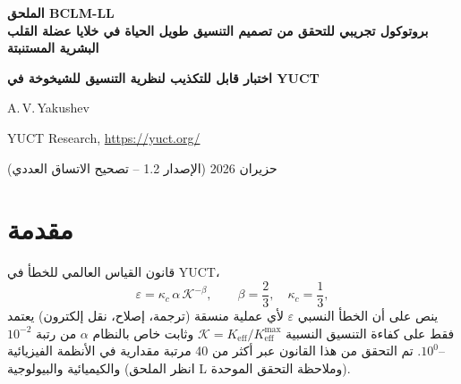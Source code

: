 \documentclass[11pt,a4paper]{article}
\newcommand{\REL}{\mathcal{K}}          %
\begin{document}
	
	\begin{titlepage}
		\centering
		\vspace*{2cm}
		{\Huge\bfseries الملحق BCLM-LL\\[0.3cm]
			بروتوكول تجريبي للتحقق من تصميم التنسيق طويل الحياة في خلايا عضلة القلب البشرية المستنبتة\par}
		\vspace{0.5cm}
		{\Large\bfseries اختبار قابل للتكذيب لنظرية التنسيق للشيخوخة في YUCT\par}
		\vspace{1.5cm}
		{\large A.\,V.\,Yakushev\par}
		{\normalsize YUCT Research, \url{https://yuct.org/}\par}
		\vspace{1.0cm}
		{\normalsize حزيران 2026 (الإصدار 1.2 – تصحيح الاتساق العددي)}\par
		\vfill
		\begin{abstract}
			\noindent
			تشرح نظرية التنسيق الموحد لياكوشيف (YUCT) الشيخوخة على أنها تقدم تناقص في كفاءة التنسيق \(K_{\mathrm{eff}}\) للأنظمة الفرعية الخلوية. توفر لاغرانجية التنسيق البيولوجي (BCLM، الملحق BCLM) إطاراً رياضياً لحساب \(K_{\mathrm{eff}}\) من بيانات التسلسل وتصميم تدخلات وراثية تعيدها إلى المستويات اليافعة. يصف هذا البروتوكول تجربة كاملة ومكتفية ذاتياً لاختبار تصميم التنسيق طويل الحياة في خلايا عضلة القلب البشرية المستنبتة. نحدد الجينات الدقيقة التي سيتم تعديلها، ونحسب كفاءات التنسيق النسبية الطبيعية والمحسنة \(\REL\)، ونستمد تنبؤات كمية لمعدل الطفرة، والإجهاد التأكسدي، وتجمع البروتين، وسرعة الهجرة، وعمر الخلية مباشرة من قانون الخطأ العالمي \(\varepsilon = \kappa_c \alpha \REL^{-\beta}\) (\(\beta=2/3\)، \(\kappa_c=1/3\))، ونقدم جدولاً زمنياً تجريبياً خطوة بخطوة. يتم تضمين وحدة انحدار خاضع للرقابة (CCR) لإظهار قابلية عكس النمط الظاهري للشيخوخة. جميع التنبؤات مسجلة مسبقاً وقابلة للتكذيب بمقايسات بيولوجيا الخلية القياسية. يحذف البروتوكول عمداً طرق الإيصال \textit{in vivo} لأسباب أخلاقية؛ يُحال القارئ إلى الملحق~\(\Sigma\).
		\end{abstract}
	\end{titlepage}
	
	\tableofcontents
	\newpage
	
	\section{مقدمة}
	\label{sec:intro}
	قانون القياس العالمي للخطأ في YUCT،
	\begin{equation}
		\varepsilon = \kappa_c \, \alpha \, \REL^{-\beta}, \qquad \beta = \frac{2}{3},\quad \kappa_c = \frac{1}{3},
		\label{eq:error-law}
	\end{equation}
	ينص على أن الخطأ النسبي \(\varepsilon\) لأي عملية منسقة (ترجمة، إصلاح، نقل إلكترون) يعتمد فقط على كفاءة التنسيق النسبية \(\REL = K_{\mathrm{eff}}/K_{\mathrm{eff}}^{\max}\) وثابت خاص بالنظام \(\alpha\) من رتبة \(10^{-2}\)–\(10^{0}\). تم التحقق من هذا القانون عبر أكثر من 40 مرتبة مقدارية في الأنظمة الفيزيائية والكيميائية والبيولوجية (انظر الملحق L وملاحظة التحقق الموحدة).
	
\end{document}
